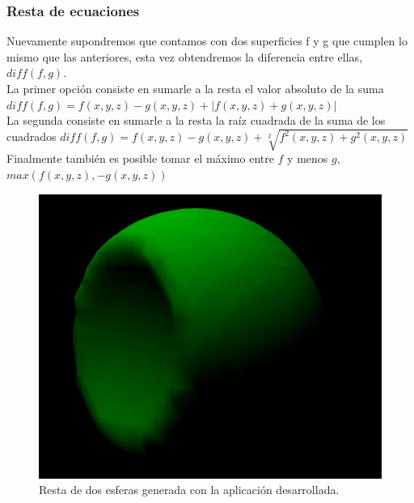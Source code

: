 \documentclass[12pt]{article}
\begin{document}
\subsubsection{Resta de ecuaciones}
Nuevamente supondremos que contamos con dos superficies f y g que cumplen lo mismo que las anteriores, esta vez obtendremos la diferencia entre ellas, $diff(f,g)$.
\\La primer opción consiste en sumarle a la resta el valor absoluto de la suma $diff(f,g) = f(x,y,z) - g(x,y,z) + |f(x,y,z) + g(x,y,z)|$
\\La segunda consiste en sumarle a la resta la raíz cuadrada de la suma de los cuadrados $diff(f,g) = f(x,y,z) - g(x,y,z) + \sqrt[2]{f^2(x,y,z) + g^2(x,y,z)}$ 
\\Finalmente también es posible tomar el máximo entre $f$ y menos $g$, $max(f(x,y,z),-g(x,y,z))$
\begin{figure}[h]
\includegraphics[width=0.7\linewidth,center]{oi3.png}
\caption{Resta de dos esferas generada con la aplicación desarrollada.}
\end{figure}
\clearpage
\end{document}

